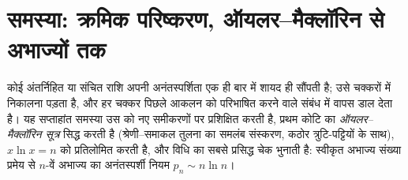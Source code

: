 \section{समस्या: क्रमिक परिष्करण, ऑयलर--मैक्लॉरिन से अभाज्यों तक}

कोई अंतर्निहित या संचित राशि अपनी अनंतस्पर्शिता एक ही बार में शायद ही
सौंपती है; उसे चक्करों में निकालना पड़ता है, और हर चक्कर पिछले आकलन को
परिभाषित करने वाले संबंध में वापस डाल देता है। यह सप्ताहांत समस्या उस
 को नए समीकरणों पर प्रशिक्षित करती है, प्रथम कोटि का
\emph{ऑयलर--मैक्लॉरिन सूत्र} सिद्ध करती है (श्रेणी--समाकल तुलना का समलंब
संस्करण, कठोर त्रुटि-पट्टियों के साथ), $x\ln x = n$ को प्रतिलोमित करती है, और
विधि का सबसे प्रसिद्ध चेक भुनाती है: स्वीकृत अभाज्य संख्या प्रमेय से
$n$-वें अभाज्य का अनंतस्पर्शी नियम $p_n \sim n\ln n$।

